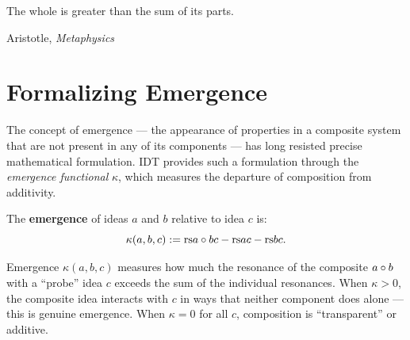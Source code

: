 \epigraph{The whole is greater than the sum of its parts.}{Aristotle,
\textit{Metaphysics}}

\section{Formalizing Emergence}

The concept of emergence --- the appearance of properties in a composite system
that are not present in any of its components --- has long resisted precise
mathematical formulation.  IDT provides such a formulation through the
\emph{emergence functional} $\kappa$, which measures the departure of
composition from additivity.

\begin{definition}[Emergence]
\label{def:emergence}
The \textbf{emergence} of ideas $a$ and $b$ relative to idea $c$ is:
\[
  \kappa(a, b, c) := \mathrm{rs}{a \circ b}{c} - \mathrm{rs}{a}{c} - \mathrm{rs}{b}{c}.
\]
\end{definition}

\begin{remark}
Emergence $\kappa(a, b, c)$ measures how much the resonance of the composite
$a \circ b$ with a ``probe'' idea $c$ exceeds the sum of the individual
resonances.  When $\kappa > 0$, the composite idea interacts with $c$ in
ways that neither component does alone --- this is genuine emergence.  When
$\kappa = 0$ for all $c$, composition is ``transparent'' or additive.
\end{remark}

